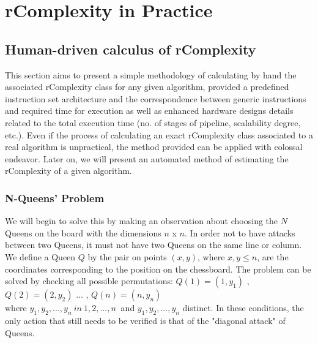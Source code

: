 \chapter{rComplexity in Practice}

\section{Human-driven calculus of rComplexity}
This section aims to present a simple methodology of calculating by hand the associated rComplexity class for any given algorithm, provided a predefined instruction set architecture and the correspondence between generic instructions and required time for execution as well as enhanced hardware designs details related to the total execution time (no. of stages of pipeline, scalability degree, etc.)\cite{hennessy2011computer}. Even if the process of calculating an exact rComplexity class associated to a real algorithm is unpractical, the method provided can be applied with colossal endeavor. Later on, we will present an automated method of estimating the rComplexity of a given algorithm.

\subsection{N-Queens’ Problem}
We will begin to solve this by making an observation about choosing the $N$ Queens on the board with the dimensions $n$ x $n$. In order not to have attacks between two Queens, it must not have two Queens on the same line or column. We define a Queen $Q$ by the pair on points $ (x, y) $, where $ x, y \leq n $, are the coordinates corresponding to the position on the chessboard.
The problem can be solved by checking all possible permutations: $ Q (1) = (1, y_1) $ , 
$ Q (2) = (2, y_2) $ ... , $ Q (n) = (n, y_n) $ \\
where $ y_1, y_2, ..., y_n \ in \ { 1,2, ..., n \ } $ and $ y_1, y_2, ..., y_n $ distinct. In these conditions, the only action that still needs to be verified is that of the "diagonal attack" of Queens.

